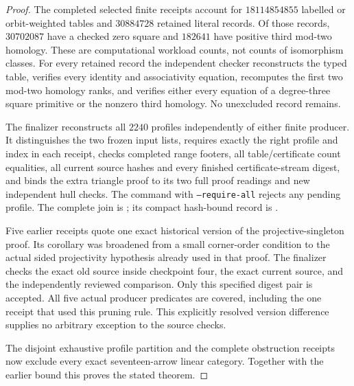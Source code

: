 \begin{proof}
The completed selected finite receipts account for
$18114854855$ labelled or orbit-weighted tables and
$30884728$ retained literal records. Of those records,
$30702087$ have a checked zero square and $182641$ have
positive third mod-two homology. These are computational
workload counts, not counts of isomorphism classes.
For every retained record the independent checker reconstructs
the typed table, verifies every identity and associativity
equation, recomputes the first two mod-two homology ranks,
and verifies either every equation of a degree-three square
primitive or the nonzero third homology. No unexcluded
record remains.

The finalizer 
reconstructs all $2240$ profiles independently of either finite
producer. It distinguishes the two frozen input lists,
requires exactly the right profile and index in each receipt,
checks completed range footers, all table/certificate count
equalities, all current source hashes and every finished
certificate-stream digest, and binds the extra triangle proof
to its two full proof readings and new independent hull checks.
The command with \texttt{--require-all} rejects any pending
profile. The complete join is
;
its compact hash-bound record is
.

Five earlier receipts quote one exact historical version of
the projective-singleton proof. Its corollary was broadened
from a small corner-order condition to the actual sided
projectivity hypothesis already used in that proof. The
finalizer checks the exact old source inside checkpoint four,
the exact current source, and the independently reviewed
comparison. Only this specified digest pair is accepted.
All five actual producer predicates are covered, including
the one receipt that used this pruning rule. This explicitly
resolved version difference supplies no arbitrary exception
to the source checks.

The disjoint exhaustive profile partition and the complete
obstruction receipts now exclude every exact seventeen-arrow
linear category. Together with the earlier bound this proves
the stated theorem.
\end{proof}
